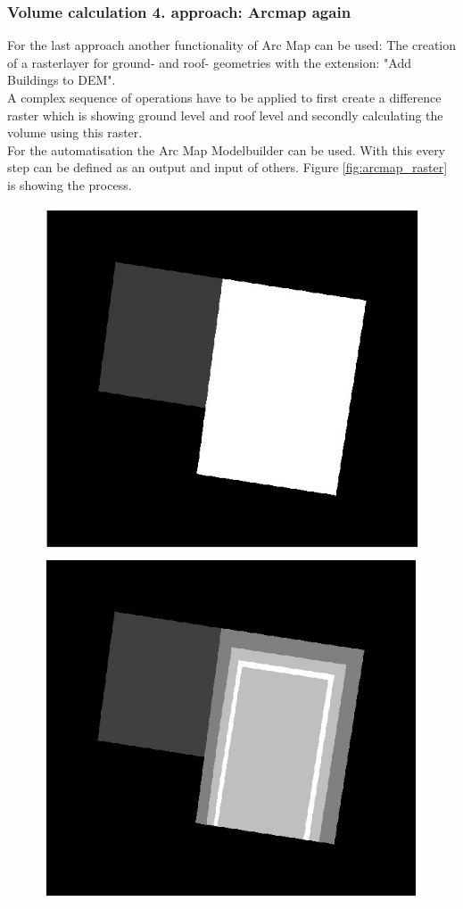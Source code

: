 \subsubsection{Volume calculation 4. approach: Arcmap again}
For the last approach another functionality of Arc Map can be used: The creation of a rasterlayer for ground- and roof- geometries with the extension: "Add Buildings to DEM".\\
A complex sequence of operations have to be applied to first create a difference raster which is showing ground level and roof level and secondly calculating the volume using this raster.\\
For the automatisation the Arc Map Modelbuilder can be used. With this every step can be defined as an output and input of others. Figure \ref{fig:arcmap_raster} is showing the process.
\begin{figure}[h]
	\centering
 	 \includegraphics[scale=0.1]{phase1/group1/raster_ground.jpg} 
	 \includegraphics[scale=0.1]{phase1/group1/raster_roof.jpg}

\end{figure}
